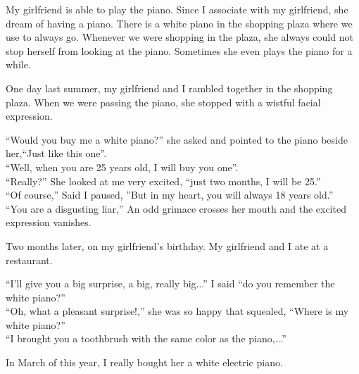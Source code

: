 \documentclass[12pt,a4paper]{caspset}
\begin{document}

My girlfriend is able to play the piano. Since I associate with my girlfriend, she dream of having a piano. There is a white piano in the shopping plaza where we use to always go. Whenever we were shopping in the plaza, she always could not stop herself from looking at the piano. Sometimes she even plays the piano for a while.

One day last summer, my girlfriend and I rambled together in the shopping plaza. When we were passing the piano, she stopped with a wistful facial expression.

``Would you buy me a white piano?'' she asked and pointed to the piano beside her,``Just like this one''.\\
``Well, when you are 25 years old, I will buy you one''.\\
``Really?'' She looked at me very excited, ``just two months, I will be 25.''\\
``Of course,'' Said I paused, ''But in my heart, you will always 18 years old.''\\
``You are a disgusting liar,'' An odd grimace crosses her mouth and the excited expression vanishes.

Two months later, on my girlfriend’s birthday. My girlfriend and I ate at a restaurant.

``I'll give you a big surprise, a big, really big...'' I said ``do you remember the white piano?''\\
``Oh, what a pleasant surprise!,'' she was so happy that squealed, ``Where is my white piano?''\\
``I brought you a toothbrush with the same color as the piano,...''

In March of this year, I really bought her a white electric piano.
\end{document}
